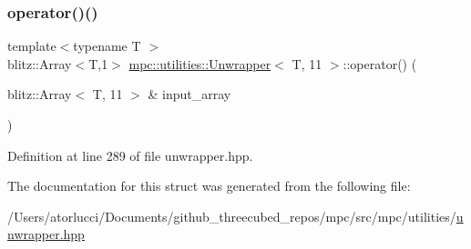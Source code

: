 \subsubsection{\texorpdfstring{operator()()}{operator()()}}
{\footnotesize\ttfamily template$<$typename T $>$ \\
blitz\+::\+Array$<$T,1$>$ \mbox{\hyperlink{structmpc_1_1utilities_1_1_unwrapper}{mpc\+::utilities\+::\+Unwrapper}}$<$ T, 11 $>$\+::operator() (\begin{DoxyParamCaption}\item[{blitz\+::\+Array$<$ T, 11 $>$ \&}]{input\+\_\+array }\end{DoxyParamCaption})\hspace{0.3cm}{\ttfamily [inline]}}



Definition at line 289 of file unwrapper.\+hpp.



The documentation for this struct was generated from the following file\+:\begin{DoxyCompactItemize}
\item 
/\+Users/atorlucci/\+Documents/github\+\_\+threecubed\+\_\+repos/mpc/src/mpc/utilities/\mbox{\hyperlink{unwrapper_8hpp}{unwrapper.\+hpp}}\end{DoxyCompactItemize}
